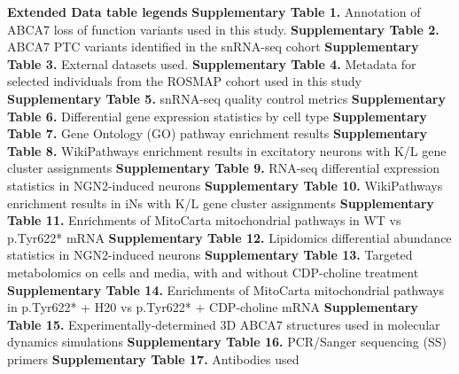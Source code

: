 \textbf{Extended Data table legends}\newline\newline
\textbf{Supplementary Table 1.} Annotation of ABCA7 loss of function variants used in this study.\newline
\textbf{Supplementary Table 2.} ABCA7 PTC variants identified in the snRNA-seq cohort\newline
\textbf{Supplementary Table 3.} External datasets used. \newline
\textbf{Supplementary Table 4.} Metadata for selected individuals from the ROSMAP cohort used in this study \newline
\textbf{Supplementary Table 5.} snRNA-seq quality control metrics \newline
\textbf{Supplementary Table 6.} Differential gene expression statistics by cell type \newline
\textbf{Supplementary Table 7.} Gene Ontology (GO) pathway enrichment results \newline
\textbf{Supplementary Table 8.} WikiPathways enrichment results in excitatory neurons with K/L gene cluster assignments \newline
\textbf{Supplementary Table 9.} RNA-seq differential expression statistics in NGN2-induced neurons \newline
\textbf{Supplementary Table 10.} WikiPathways enrichment results in iNs with K/L gene cluster assignments \newline
\textbf{Supplementary Table 11.} Enrichments of MitoCarta mitochondrial pathways in WT vs p.Tyr622* mRNA \newline
\textbf{Supplementary Table 12.} Lipidomics differential abundance statistics in NGN2-induced neurons \newline
\textbf{Supplementary Table 13.} Targeted metabolomics on cells and media, with and without CDP-choline treatment \newline
\textbf{Supplementary Table 14.} Enrichments of MitoCarta mitochondrial pathways in p.Tyr622* + H20 vs p.Tyr622* + CDP-choline mRNA \newline
\textbf{Supplementary Table 15.} Experimentally-determined 3D ABCA7 structures used in molecular dynamics simulations \newline
\textbf{Supplementary Table 16.} PCR/Sanger sequencing (SS) primers \newline
\textbf{Supplementary Table 17.} Antibodies used \newline

